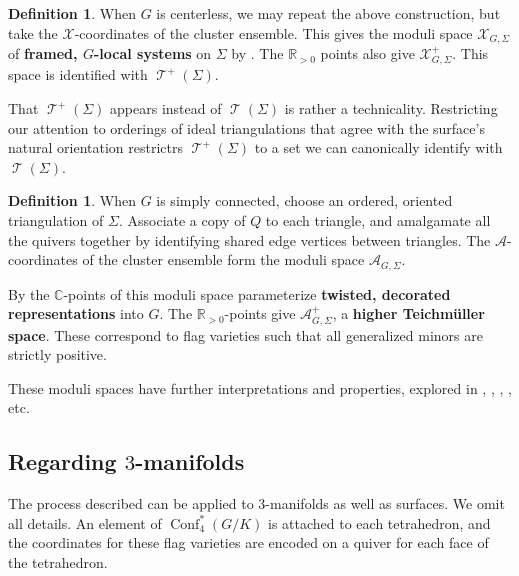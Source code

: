 \documentclass{amsart}
\theoremstyle{plain}
\theoremstyle{definition}
\newtheorem{definition}[theorem]{Definition}
\theoremstyle{remark}
\newcommand{\defined}[1]{\textbf{#1}}
\DeclareMathOperator{\Conf}{Conf}
\DeclareMathOperator{\teich}{\mathcal{T}}
\begin{document}
  \begin{definition}
    When $G$ is centerless, we may repeat the above construction, but
    take the $\mathcal{X}$-coordinates of the cluster ensemble. This
    gives the moduli space $\mathcal{X}_{G,\Sigma}$ of \defined{framed,
      $G$-local systems} on $\Sigma$ by
    \cite[Section~2.1]{fockgoncharov2006}. The $\mathbb{R}_{>0}$ points
    also give $\mathcal{X}^{+}_{G,\Sigma}$. This space is identified
    with $\teich^{+}(\Sigma)$.

    That $\teich^{+}(\Sigma)$ appears instead of $\teich(\Sigma)$ is
    rather a technicality. Restricting our attention to orderings of
    ideal triangulations that agree with the surface's natural
    orientation restrictrs $\teich^{+}(\Sigma)$ to a set we can
    canonically identify with $\teich(\Sigma)$.
  \end{definition}

  \begin{definition}
    When $G$ is simply connected, choose an ordered, oriented
    triangulation of $\Sigma$. Associate a copy of $Q$ to each triangle,
    and amalgamate all the quivers together by identifying shared edge
    vertices between triangles. The $\mathcal{A}$-coordinates of the
    cluster ensemble form the moduli space $\mathcal{A}_{G,\Sigma}$.

    By \cite[Section~8.6]{fockgoncharov2006} the $\mathbb{C}$-points of
    this moduli space parameterize \defined{twisted, decorated
      representations} into $G$. The $\mathbb{R}_{>0}$-points give
    $\mathcal{A}^{+}_{G,\Sigma}$, a \defined{higher Teichmüller space}.
    These correspond to flag varieties such that all generalized minors
    are strictly positive.
  \end{definition}

  These moduli spaces have further interpretations and properties,
  explored in \cite{fockgoncharov2006}, \cite{fockgoncharov2006_2},
  \cite{fockgoncharov2009}, \cite{goncharovshen2018}, etc.

  \subsection{Regarding \texorpdfstring{$3$}{3}-manifolds}

  The process described can be applied to $3$-manifolds as well as
  surfaces. We omit all details. An element of $\Conf_4^{\ast}(G/K)$ is
  attached to each tetrahedron, and the coordinates for these flag
  varieties are encoded on a quiver for each face of the tetrahedron.
\end{document}
